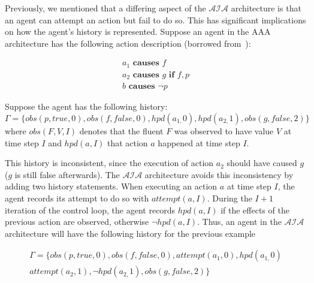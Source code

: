 Previously, we mentioned that a differing aspect of the $\mathcal{AIA}$ architecture is that an agent can attempt an action but fail to do so.
This has significant implications on how the agent's history is represented.
Suppose an agent in the AAA architecture has the following action description (borrowed from~\citep{blount_towards_2014}):

\begin{gather}
    a_1 \textbf{ causes } f \\
    a_2 \textbf{ causes } g \textbf{ if } f, p \\
    b \textbf{ causes } \neg p
\end{gather}

Suppose the agent has the following history\footnotemark:
\begin{equation}
    \Gamma=\{obs\left(p,true,0\right),obs\left(f,false,0\right),hpd\left(a_{1,}0\right),hpd\left(a_{2,}1\right),obs\left(g,false,2\right)\}
\end{equation}
where $obs(F, V, I)$ denotes that the fluent $F$ was observed to have value $V$ at time step $I$ and $hpd(a, I)$ that action $a$ happened at time step $I$.


This history is inconsistent, since the execution of action $a_2$ should have caused $g$ ($g$ is still false afterwards).
The $\mathcal{AIA}$ architecture avoids this inconsistency by adding two history statements.
When executing an action $a$ at time step $I$, the agent records its attempt to do so with $attempt(a, I)$.
During the $I+1$ iteration of the control loop, the agent records $hpd(a, I)$ if the effects of the previous action are observed, otherwise $\neg hpd(a, I)$.
Thus, an agent in the $\mathcal{AIA}$ architecture will have the following history for the previous example

\begin{multline}
    \Gamma=\{
        obs\left(p,true,0\right),obs\left(f,false,0\right),attempt(a_1, 0),hpd\left(a_{1,}0\right) \\
        attempt(a_2, 1), \neg hpd\left(a_{2,}1\right),obs\left(g,false,2\right)
    \}
\end{multline}

